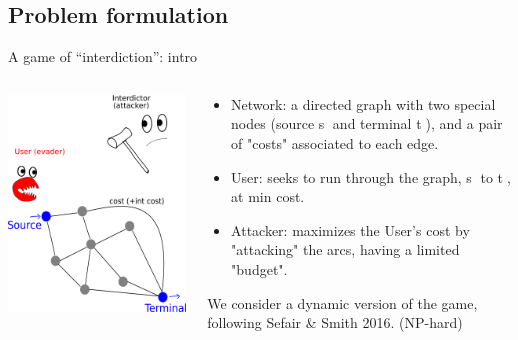 \documentclass[10pt, xcolor=svgnames]{beamer}
\begin{document}
\subsection{Problem formulation}
\label{sec:org1163ac8}
\begin{frame}[label={sec:org8204669}]{A game of ``interdiction'': intro}
\begin{columns}
\begin{column}[t]{0.4\columnwidth}
\begin{center}
\includegraphics[width=.9\linewidth]{./img/SPI.png}
\end{center}
\end{column}

\begin{column}[t]{0.6\columnwidth}
\begin{itemize}
\item \alert{Network:} a directed graph with two special nodes (source \textcircled{s} and terminal \textcircled{t}), and a pair of "costs" associated to each edge.
\item \alert{User:} seeks to run through the graph, \textcircled{s} to \textcircled{t}, at min cost.
\item \alert{Attacker:} maximizes the User's cost by "attacking" the arcs, having a limited "budget".
\end{itemize}

We consider a \alert{dynamic} version of the game, following Sefair \& Smith 2016. (NP-hard)
\end{column}
\end{columns}
\end{frame}
\end{document}
